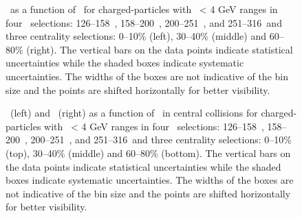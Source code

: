 
\begin{figure}
   \caption{\DeltaTheta\ as a function of \rvar\ for charged-particles with \pt\ < 4 GeV ranges in 
   four \ptjet\ selections: 126--158~\GeV, 158--200~\GeV, 200--251~\GeV, and 251--316~\GeV and three centrality 
   selections: 0--10\% (left), 30--40\% (middle) and 60--80\% (right). 
   The vertical bars on the data points indicate statistical uncertainties while the shaded boxes indicate systematic uncertainties. The widths of the boxes are not indicative of the bin size and the points are shifted horizontally for better visibility. }
      \label{fig:deltaPdeltaT}
\end{figure}


\begin{figure}
   \caption{\RTheta\ (left) and \RP\ (right) as a function of \rvar\ in central collisions for charged-particles with \pt\ < 4 GeV ranges in four \ptjet\ selections: 126--158~\GeV, 158--200~\GeV, 200--251~\GeV, and 251--316~\GeV and three centrality selections: 0--10\% (top), 30--40\% (middle) and 60--80\% (bottom). The vertical bars on the data points indicate statistical uncertainties while the shaded boxes indicate systematic uncertainties. The widths of the boxes are not indicative of the bin size and the points are shifted horizontally for better visibility. }
      \label{fig:RPRT}
\end{figure}



